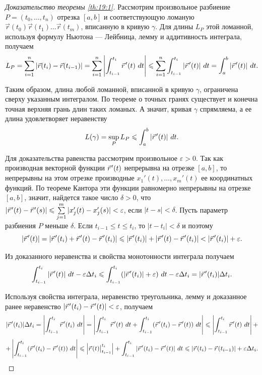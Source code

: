\documentclass[12pt]{report}
\numberwithin{equation}{section}
\newcommand{\pvec}[1]{\vec{#1}\mkern2mu\vphantom{#1}}
\begin{document}
\begin{proof} [Доказательство теоремы \ref{th:19:1}]
Рассмотрим произвольное разбиение $P = (t_0, \ldots, t_n)$ отрезка $[a,b]$ и соответствующую ломаную $\vec{r}(t_0) \vec{r}(t_1) \ldots \vec{r}(t_m)$, вписанную в кривую $\gamma$. Для длины $L_P$ этой ломанной, используя формулу Ньютона --- Лейбница, лемму и аддитивность интеграла, получаем
\[ L_P = \sum_{i=1}^n | \vec{r}(t_i) - \vec{r} (t_{i - 1})| = \sum_{i=1}^n \left| \int_{t_{i-1}}^{t_i} \pvec{r}'(t)~dt \right| \leqslant \sum_{i=1}^n \int_{t_{i-1}}^{t_i} | \pvec{r}'(t)| ~dt = \int_a^b |\pvec{r}'(t)|~dt.\]

Таким образом, длина любой ломанной, вписанной в кривую $\gamma$, ограничена сверху указанным интегралом. По теореме о точных гранях существует и конечна точная верхняя грань длин таких ломаных. А значит, кривая $\gamma$ спрямляема, а ее длина удовлетворяет неравенству
\[ L(\gamma) = \sup_{P}L_P \leqslant \int_a^b |\pvec{r}'(t)|~dt.\]

Для доказательства равенства рассмотрим произвольное $\varepsilon > 0$. Так как производная векторной функции $\pvec{r}'(t)$ непрерывна на отрезке $[a,b]$, то непрерывны на этом отрезке производные $x_1'(t), \ldots, x_m'(t)$ ее координатных функций. По теореме Кантора эти функции равномерно непрерывны на отрезке $[a,b]$, значит, найдется такое число $\delta > 0$, что $|\pvec{r}'(t) - \pvec{r}'(s)| \leqslant \sum\limits_{j=1}^m |x_j'(t) - x_j'(s)| < \varepsilon$, если $|t - s| < \delta$. Пусть параметр разбиения $P$ меньше $\delta$. Если $t_{i-1} \leqslant t \leqslant t_i$, то $|t - t_i| < \delta$ и поэтому
\[ |\pvec{r}'(t)| = |\pvec{r}'(t_i) + \pvec{r}'(t) - \pvec{r}'(t_i) | \leqslant |\pvec{r}'(t_i)| + |\pvec{r}'(t) - \pvec{r}'(t_i)| < |\pvec{r}'(t_i)| + \varepsilon.\]

Из доказанного неравенства и свойства монотонности интеграла получаем
\[ \int_{t_{i-1}}^{t_i} |\pvec{r}'(t)|~dt - \varepsilon \Delta t_i \leqslant \int_{t_{i-1}}^{t_i} (|\pvec{r}'(t_i)| + \varepsilon)~dt - \varepsilon \Delta t_i = |\pvec{r}'(t_i)| \Delta t_i.\]

Используя свойства интеграла, неравенство треугольника, лемму и доказанное ранее неравенство $|\pvec{r}'(t_i) - \pvec{r}'(t)| < \varepsilon$, получаем
\[ |\pvec{r}'(t_i)| \Delta t_i = \left| \int_{t_{i-1}}^{t_i} \pvec{r}'(t_i)~dt \right| = \left| \int_{t_{i-1}}^{t_i} \pvec{r}'(t)~dt  + \int_{t_{i-1}}^{t_i} (\pvec{r}'(t_i) - \pvec{r}'(t))~dt \right| \leqslant \left| \int_{t_{i-1}}^{t_i} \pvec{r}'(t)~dt \right| +\]
\[+ \left| \int_{t_{i-1}}^{t_i} (\pvec{r}'(t_i) - \pvec{r}'(t))~dt \right| \leqslant \left\lvert \pvec{r}(t)\bigr\vert_{t_{i-1}}^{t_i} \right\rvert  + \int_{t_{i-1}}^{t_i} |\pvec{r}'(t_i) - \pvec{r}'(t)| ~dt \leqslant |\pvec{r}(t_i) - \pvec{r}(t_{i-1}) | + \varepsilon \Delta t_i.\]


\end{proof}
\end{document}
